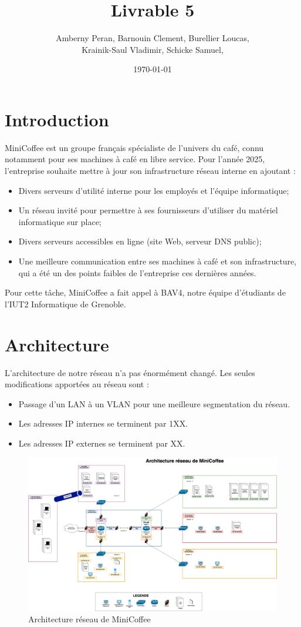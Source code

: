 \documentclass{article}
\title{Livrable 5}
\author{
Amberny Peran, Barnouin Clement, Burellier Loucas, \\
Krainik-Saul Vladimir, Schicke Samuel, 
}
\date{\today}
\begin{document}
\maketitle


\section{Introduction}
MiniCoffee est un groupe français spécialiste de l’univers du café, connu notamment pour ses machines à café en libre service. Pour l’année 2025, l’entreprise souhaite mettre à jour son infrastructure réseau interne en ajoutant : 
\begin{itemize}
    \item Divers serveurs d’utilité interne pour les employés et l'équipe informatique;
    \item Un réseau invité pour permettre à ses fournisseurs d’utiliser du matériel informatique sur place;
    \item Divers serveurs accessibles en ligne (site Web, serveur DNS public);
    \item Une meilleure communication entre ses machines à café et son infrastructure, qui a été un des points faibles de l’entreprise ces dernières années.
\end{itemize}
Pour cette tâche, MiniCoffee a fait appel à BAV4, notre équipe d’étudiants de l’IUT2 Informatique de Grenoble.

\section{Architecture}
L'architecture de notre réseau n'a pas énormément changé. 
Les seules modifications apportées au réseau sont : 
\begin{itemize}
    \item Passage d'un LAN à un VLAN pour une meilleure segmentation du réseau.
    \item Les adresses IP internes se terminent par 1XX.
    \item Les adresses IP externes se terminent par XX.
\end{itemize}

\begin{figure}
    \centering
    \includegraphics[angle=-90, width=1\textwidth, trim=0 0 0 2.3cm, clip]{../assets/Architecture.drawio.png}
    \caption{Architecture réseau de MiniCoffee}
\end{figure}
\end{document}
